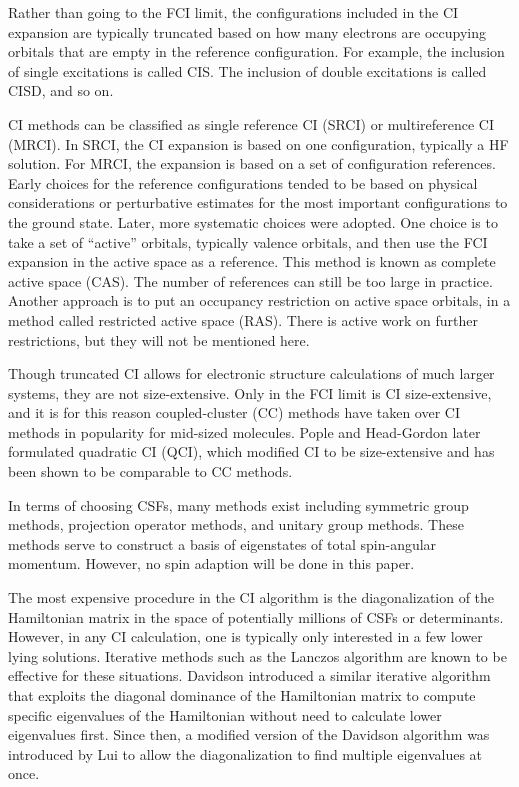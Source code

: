 \documentclass[final,3p,times,twocolumn]{elsarticle}
\begin{document}
Rather than going to the FCI limit, the configurations included in the CI expansion are typically truncated based on how many electrons are occupying orbitals that are empty in the reference configuration. For example, the inclusion of single excitations is called CIS. The inclusion of double excitations is called CISD, and so on.\cite{szabo}  

CI methods can be classified as single reference CI (SRCI) or multireference CI (MRCI). In SRCI, the CI expansion is based on one configuration, typically a HF solution. For MRCI, the expansion is based on a set of configuration references.\cite{hackmeyer-1969} Early choices for the reference configurations tended to be based on physical considerations\cite{shavitt-1974} or perturbative estimates for the most important configurations to the ground state.\cite{nesbet-1955} Later, more systematic choices were adopted. One choice is to take a set of ``active'' orbitals, typically valence orbitals, and then use the FCI expansion in the active space as a reference.\cite{cas} This method is known as complete active space (CAS). The number of references can still be too large in practice. Another approach is to put an occupancy restriction on active space orbitals, in a method called restricted active space (RAS).\cite{ras} There is active work on further restrictions,\cite{shavitt} but they will not be mentioned here.

Though truncated CI allows for electronic structure calculations of much larger systems, they are not size-extensive. Only in the FCI limit is CI size-extensive, and it is for this reason coupled-cluster (CC) methods have taken over CI methods in popularity for mid-sized molecules.\cite{cc,bartlett-2007} Pople and Head-Gordon later formulated quadratic CI (QCI), which modified CI to be size-extensive\cite{qci} and has been shown to be comparable to CC methods.\cite{werner-1992}

In terms of choosing CSFs, many methods exist including symmetric group methods,\cite{wigner} projection operator methods,\cite{lowdin} and unitary group methods.\cite{paldus-1974} These methods serve to construct a basis of eigenstates of total spin-angular momentum. However, no spin adaption will be done in this paper. %

The most expensive procedure in the CI algorithm is the diagonalization of the Hamiltonian matrix in the space of potentially millions of CSFs or determinants. However, in any CI calculation, one is typically only interested in a few lower lying solutions. Iterative methods such as the Lanczos algorithm are known to be effective for these situations.\cite{Lanczos} Davidson introduced a similar iterative algorithm that exploits the diagonal dominance of the Hamiltonian matrix to compute specific eigenvalues of the Hamiltonian without need to calculate lower eigenvalues first.\cite{davidson} Since then, a modified version of the Davidson algorithm was introduced by Lui to allow the diagonalization to find multiple eigenvalues at once.\cite{liu}
\end{document}
